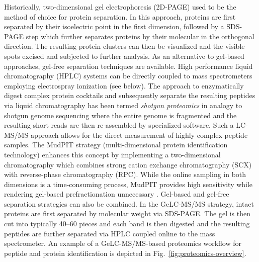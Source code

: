 Historically, two-dimensional gel electrophoresis (2D-PAGE) used to be the 
method of choice for protein separation. 
In this approach, proteins are first separated by their isoelectric point in
the first dimension, followed by a SDS-PAGE step which further separates
proteins by their molecular in the orthogonal direction.
The resulting protein clusters can then be visualized and the visible spots
excised and subjected to further analysis.
As an alternative to gel-based approaches, gel-free separation techniques
are available.
High performance liquid chromatography (HPLC) systems can be directly coupled
to mass spectrometers employing electrospray ionization (see below).
The approach to enzymatically digest complex protein cocktails and subsequently
separate the resulting peptides via liquid chromatography has been termed 
{\em shotgun proteomics} in analogy to shotgun genome sequencing where
the entire genome is fragmented and the resulting short reads are then 
re-assembled by specialized software.
Such a LC-MS/MS approach allows for the direct measurement of highly complex 
peptide samples.
The MudPIT strategy (multi-dimensional protein identification technology) 
enhances this concept by implementing a two-dimensional
chromatography which combines strong cation exchange chromatography (SCX) with
reverse-phase chromatography (RPC).
While the online sampling in both dimensions is a time-consuming process,
MudPIT provides high sensitivity while rendering gel-based prefractionation 
unnecessary \citep{Washburn2001, Wolters2001}.
Gel-based and gel-free separation strategies can also be combined.
In the GeLC-MS/MS strategy, intact proteins are 
first separated by molecular weight via SDS-PAGE.
The gel is then cut into typically 40--60 pieces and each band is then 
digested and the resulting peptides are further separated via HPLC
coupled online to the mass spectrometer.
An example of a GeLC-MS/MS-based proteomics workflow for peptide and protein 
identification is depicted in Fig.~\ref{fig:proteomics-overview}.

